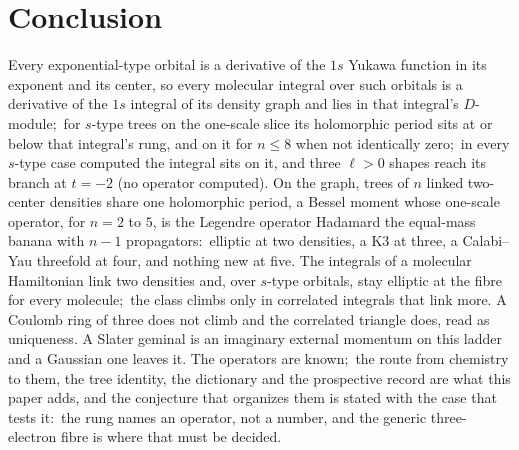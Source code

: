 \documentclass[aps,pra,twocolumn,superscriptaddress,longbibliography]{revtex4-2}
\begin{document}
\section{Conclusion}

Every exponential-type orbital is a derivative of the $1s$ Yukawa function
in its exponent and its center, so every molecular integral over such
orbitals is a derivative of the $1s$ integral of its density graph and lies
in that integral's $D$-module;\ for $s$-type trees on the one-scale slice its
holomorphic period sits at or below that integral's rung, and on it for
$n\le8$ when not identically zero;\ in every $s$-type case computed the
integral sits on it, and three $\ell>0$ shapes reach its branch at $t=-2$ (no
operator computed).  On
the graph, trees of $n$ linked two-center
densities share one holomorphic period, a Bessel moment whose one-scale
operator, for $n=2$ to $5$, is the Legendre operator Hadamard the equal-mass
banana with $n-1$ propagators:\
elliptic at two densities, a K3 at three, a Calabi--Yau threefold at four, and
nothing new at five.  The integrals of a molecular Hamiltonian link two
densities and, over $s$-type orbitals, stay elliptic at the fibre for every
molecule;\ the class
climbs only in correlated integrals that link more.  A Coulomb ring of three
does not climb and the correlated triangle does, read as uniqueness.  A Slater geminal
is an imaginary external momentum on this ladder and a Gaussian one leaves
it.  The operators are known;\ the route from chemistry to them, the tree
identity, the dictionary and the prospective record are what this paper adds,
and the conjecture that organizes them is stated with the case that tests
it:\ the rung names an operator, not a number, and the generic three-electron
fibre is where that must be decided.
\end{document}
